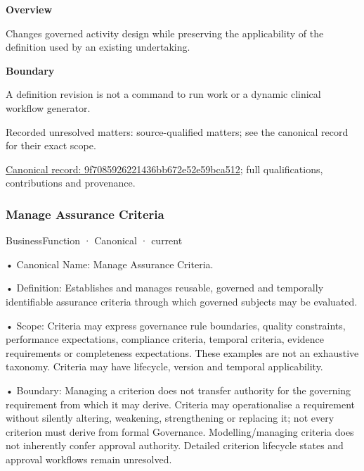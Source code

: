 \textbf{Overview}



Changes governed activity design while preserving the applicability of the definition used by an existing undertaking.



\textbf{Boundary}



A definition revision is not a command to run work or a dynamic clinical workflow generator.


{\small Recorded unresolved matters: source-qualified matters; see the canonical record for their exact scope.}\par
{\footnotesize \href{../../../../continuum/business/business-function/9f7085926221436bb672e52e59bca512.md}{Canonical record: 9f7085926221436bb672e52e59bca512}; full qualifications, contributions and provenance.}\par
\subsubsection{Manage Assurance Criteria}

\label{element:d7e9ba5addd94db2bce164c7c9809e4e}
{\small BusinessFunction · Canonical · current}\par

•
Canonical Name: Manage Assurance Criteria.



•
Definition: Establishes and manages reusable, governed and temporally identifiable assurance criteria through which governed subjects may be evaluated.



•
Scope: Criteria may express governance rule boundaries, quality constraints, performance expectations, compliance criteria, temporal criteria, evidence requirements or completeness expectations. These examples are not an exhaustive taxonomy. Criteria may have lifecycle, version and temporal applicability.



•
Boundary: Managing a criterion does not transfer authority for the governing requirement from which it may derive. Criteria may operationalise a requirement without silently altering, weakening, strengthening or replacing it; not every criterion must derive from formal Governance. Modelling/managing criteria does not inherently confer approval authority. Detailed criterion lifecycle states and approval workflows remain unresolved.



